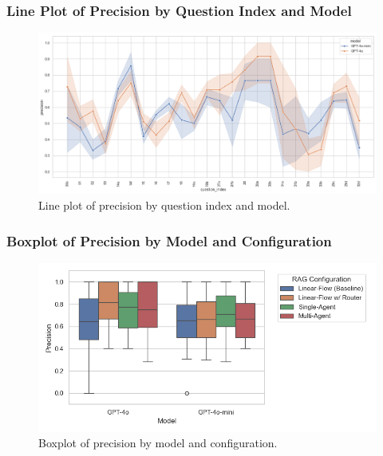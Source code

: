             \subsubsection{Line Plot of Precision by Question Index and Model}
            \begin{figure}[H]
                \centering
                \includegraphics[width=\textwidth]{images_exp2/precision/line_precision_by_question_index_and_model.png}
                \caption{Line plot of precision by question index and model.}
                \label{fig:line_precision_by_question_index_and_model}
            \end{figure}

            \subsubsection{Boxplot of Precision by Model and Configuration}
            \begin{figure}[H]
                \centering
                \includegraphics[scale=0.75]{images_exp2/precision/precision_boxplot_by_model_and_configuration.png}
                \caption{Boxplot of precision by model and configuration.}
                \label{fig:precision_boxplot_by_model_and_configuration}
            \end{figure}

